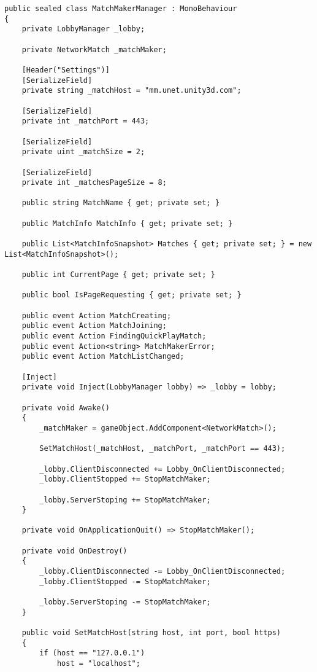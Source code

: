 \begin{lstlisting}
public sealed class MatchMakerManager : MonoBehaviour
{
    private LobbyManager _lobby;

    private NetworkMatch _matchMaker;

    [Header("Settings")]
    [SerializeField]
    private string _matchHost = "mm.unet.unity3d.com";

    [SerializeField]
    private int _matchPort = 443;

    [SerializeField]
    private uint _matchSize = 2;

    [SerializeField]
    private int _matchesPageSize = 8;

    public string MatchName { get; private set; }

    public MatchInfo MatchInfo { get; private set; }

    public List<MatchInfoSnapshot> Matches { get; private set; } = new List<MatchInfoSnapshot>();

    public int CurrentPage { get; private set; }

    public bool IsPageRequesting { get; private set; }

    public event Action MatchCreating;
    public event Action MatchJoining;
    public event Action FindingQuickPlayMatch;
    public event Action<string> MatchMakerError;
    public event Action MatchListChanged;

    [Inject]
    private void Inject(LobbyManager lobby) => _lobby = lobby;

    private void Awake()
    {
        _matchMaker = gameObject.AddComponent<NetworkMatch>();

        SetMatchHost(_matchHost, _matchPort, _matchPort == 443);

        _lobby.ClientDisconnected += Lobby_OnClientDisconnected;
        _lobby.ClientStopped += StopMatchMaker;

        _lobby.ServerStoping += StopMatchMaker;
    }

    private void OnApplicationQuit() => StopMatchMaker();

    private void OnDestroy()
    {
        _lobby.ClientDisconnected -= Lobby_OnClientDisconnected;
        _lobby.ClientStopped -= StopMatchMaker;

        _lobby.ServerStoping -= StopMatchMaker;
    }

    public void SetMatchHost(string host, int port, bool https)
    {
        if (host == "127.0.0.1")
            host = "localhost";


\end{lstlisting}
